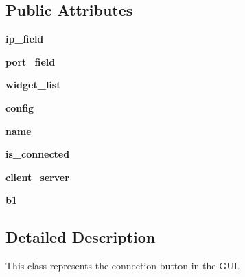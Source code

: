 \subsection*{Public Attributes}
\begin{DoxyCompactItemize}
\item 
\hypertarget{classButon_1_1ConnectButon_a9b455e937c6ad5aab8d6e60ddd9496f5}{{\bfseries ip\+\_\+field}}\label{classButon_1_1ConnectButon_a9b455e937c6ad5aab8d6e60ddd9496f5}

\item 
\hypertarget{classButon_1_1ConnectButon_ab54e8a2c425b7a4c6aff44c2623fbd24}{{\bfseries port\+\_\+field}}\label{classButon_1_1ConnectButon_ab54e8a2c425b7a4c6aff44c2623fbd24}

\item 
\hypertarget{classButon_1_1ConnectButon_a17242a57a26a2c443a62561d4d983741}{{\bfseries widget\+\_\+list}}\label{classButon_1_1ConnectButon_a17242a57a26a2c443a62561d4d983741}

\item 
\hypertarget{classButon_1_1ConnectButon_a6cd823bde194e14b1c175a3c49562cf6}{{\bfseries config}}\label{classButon_1_1ConnectButon_a6cd823bde194e14b1c175a3c49562cf6}

\item 
\hypertarget{classButon_1_1ConnectButon_ad1dd74b57aeaed6fa0d714289c499201}{{\bfseries name}}\label{classButon_1_1ConnectButon_ad1dd74b57aeaed6fa0d714289c499201}

\item 
\hypertarget{classButon_1_1ConnectButon_a284dc0bd6a3af534db6e29e028a2e58d}{{\bfseries is\+\_\+connected}}\label{classButon_1_1ConnectButon_a284dc0bd6a3af534db6e29e028a2e58d}

\item 
\hypertarget{classButon_1_1ConnectButon_a78e95a37da9638f98494cae0779cf003}{{\bfseries client\+\_\+server}}\label{classButon_1_1ConnectButon_a78e95a37da9638f98494cae0779cf003}

\item 
\hypertarget{classButon_1_1ConnectButon_a4832ee9eade05a27e4691aa17a00b16a}{{\bfseries b1}}\label{classButon_1_1ConnectButon_a4832ee9eade05a27e4691aa17a00b16a}

\end{DoxyCompactItemize}


\subsection{Detailed Description}
This class represents the connection button in the G\+U\+I. 

